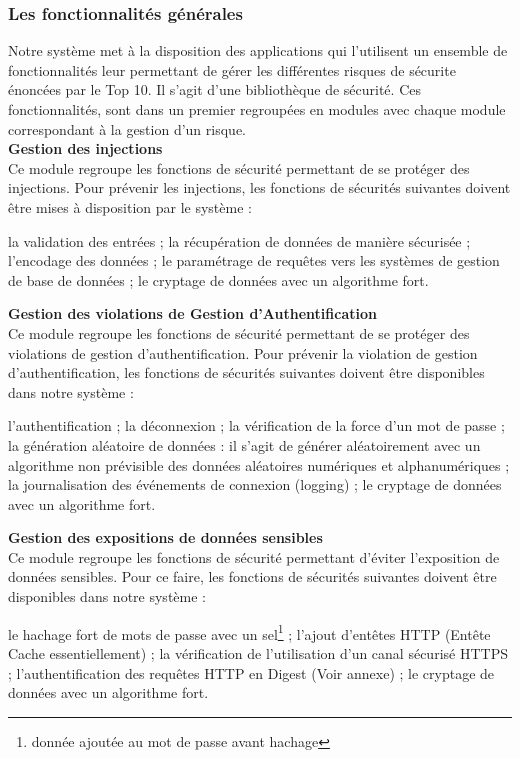 \subsubsection{Les fonctionnalités générales}
Notre système met à la disposition des applications qui l'utilisent un ensemble de fonctionnalités leur permettant de gérer les différentes risques de sécurite énoncées par le Top 10. Il s'agit d'une bibliothèque de sécurité. Ces fonctionnalités, sont dans un premier regroupées en modules avec chaque module correspondant à la gestion d'un risque.\\

\textbf{\RIGHTarrow Gestion des injections}\\
Ce module regroupe les fonctions de sécurité permettant de se protéger des injections. Pour prévenir les injections, les fonctions de sécurités suivantes doivent être mises à disposition par le système : 
\begin{itemize}
	\itemcheck la validation des entrées ; 
	\itemcheck la récupération de données de manière sécurisée ; 
	\itemcheck l’encodage des données ; 
	\itemcheck le paramétrage de requêtes vers les systèmes de gestion de base de données ; 
	\itemcheck le cryptage de données avec un algorithme fort.\\
\end{itemize}

\textbf{\RIGHTarrow Gestion des violations de Gestion d’Authentification}\\
Ce module regroupe les fonctions de sécurité permettant de se protéger des violations de gestion d'authentification. Pour prévenir la violation de gestion d'authentification, les fonctions de sécurités suivantes doivent être disponibles dans notre système :
 \begin{itemize}
 	\itemcheck l'authentification ;
 	\itemcheck la déconnexion ;
 	\itemcheck la vérification de la force d'un mot de passe ; 
 	\itemcheck la génération aléatoire de données : il s'agit de générer aléatoirement avec un algorithme non prévisible des données aléatoires numériques et alphanumériques ; 
 	\itemcheck la journalisation des événements de connexion (logging) ; 
 	\itemcheck le cryptage de données avec un algorithme fort.\\
 \end{itemize}

\textbf{\RIGHTarrow Gestion des expositions de données sensibles}\\
Ce module regroupe les fonctions de sécurité permettant d'éviter l'exposition de données sensibles. Pour ce faire, les fonctions de sécurités suivantes doivent être disponibles dans notre système :
\begin{itemize}
	\itemcheck le hachage fort de mots de passe avec un sel\footnote{donnée ajoutée au mot de passe avant hachage} ;
	\itemcheck l'ajout d'entêtes HTTP (Entête Cache essentiellement) ;
	\itemcheck la vérification de l'utilisation d'un canal sécurisé HTTPS ;
	\itemcheck l'authentification des requêtes HTTP en Digest (Voir annexe) ;
	\itemcheck le cryptage de données avec un algorithme fort.\\
\end{itemize}

